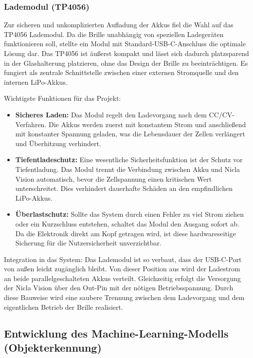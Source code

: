 \subsubsection*{Lademodul (TP4056)}
Zur sicheren und unkomplizierten Aufladung der Akkus fiel die Wahl auf das TP4056 Lademodul. Da die Brille unabhängig von speziellen Ladegeräten funktionieren soll, stellte ein Modul mit Standard-USB-C-Anschluss die optimale Lösung dar. Das TP4056 ist äußerst kompakt und lässt sich dadurch platzsparend in der Glashalterung platzieren, ohne das Design der Brille zu beeinträchtigen. Es fungiert als zentrale Schnittstelle zwischen einer externen Stromquelle und den internen LiPo-Akkus.

Wichtigste Funktionen für das Projekt:
\begin{itemize}
    \item \textbf{Sicheres Laden:} Das Modul regelt den Ladevorgang nach dem CC/CV-Verfahren. Die Akkus werden zuerst mit konstantem Strom und anschließend mit konstanter Spannung geladen, was die Lebensdauer der Zellen verlängert und Überhitzung verhindert.
    \item \textbf{Tiefentladeschutz:} Eine wesentliche Sicherheitsfunktion ist der Schutz vor Tiefentladung. Das Modul trennt die Verbindung zwischen Akku und Nicla Vision automatisch, bevor die Zellspannung einen kritischen Wert unterschreitet. Dies verhindert dauerhafte Schäden an den empfindlichen LiPo-Akkus.
    \item \textbf{Überlastschutz:} Sollte das System durch einen Fehler zu viel Strom ziehen oder ein Kurzschluss entstehen, schaltet das Modul den Ausgang sofort ab. Da die Elektronik direkt am Kopf getragen wird, ist diese hardwareseitige Sicherung für die Nutzersicherheit unverzichtbar.
\end{itemize}
Integration in das System: Das Lademodul ist so verbaut, dass der USB-C-Port von außen leicht zugänglich bleibt. Von dieser Position aus wird der Ladestrom an beide parallelgeschalteten Akkus verteilt. Gleichzeitig erfolgt die Versorgung der Nicla Vision über den Out-Pin mit der nötigen Betriebsspannung. Durch diese Bauweise wird eine saubere Trennung zwischen dem Ladevorgang und dem eigentlichen Betrieb der Brille realisiert.


\subsection{Entwicklung des Machine-Learning-Modells (Objekterkennung)}
\label{sec:ml_training}

